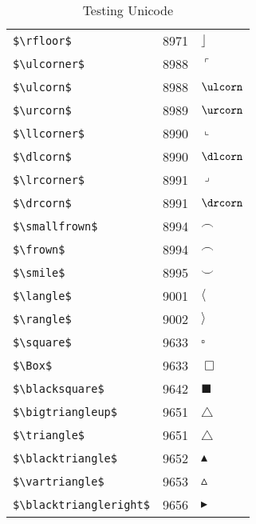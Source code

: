 \documentclass{article}
\begin{document}
\begin{table}
\begin{center}
\begin{tabular}{lll}
\verb#$\rfloor$# & 8971 & $\rfloor$\\ 
\verb#$\ulcorner$# & 8988 & $\ulcorner$\\ 
\verb#$\ulcorn$# & 8988 & $\ulcorn$\\ 
\verb#$\urcorn$# & 8989 & $\urcorn$\\ 
\verb#$\llcorner$# & 8990 & $\llcorner$\\ 
\verb#$\dlcorn$# & 8990 & $\dlcorn$\\ 
\verb#$\lrcorner$# & 8991 & $\lrcorner$\\ 
\verb#$\drcorn$# & 8991 & $\drcorn$\\ 
\verb#$\smallfrown$# & 8994 & $\smallfrown$\\ 
\verb#$\frown$# & 8994 & $\frown$\\ 
\verb#$\smile$# & 8995 & $\smile$\\ 
\verb#$\langle$# & 9001 & $\langle$\\ 
\verb#$\rangle$# & 9002 & $\rangle$\\ 
\verb#$\square$# & 9633 & $\square$\\ 
\verb#$\Box$# & 9633 & $\Box$\\ 
\verb#$\blacksquare$# & 9642 & $\blacksquare$\\ 
\verb#$\bigtriangleup$# & 9651 & $\bigtriangleup$\\ 
\verb#$\triangle$# & 9651 & $\triangle$\\ 
\verb#$\blacktriangle$# & 9652 & $\blacktriangle$\\ 
\verb#$\vartriangle$# & 9653 & $\vartriangle$\\ 
\verb#$\blacktriangleright$# & 9656 & $\blacktriangleright$\\ 
\end{tabular}
\end{center}
\caption{Testing Unicode}
\end{table}
\clearpage
\end{document}
